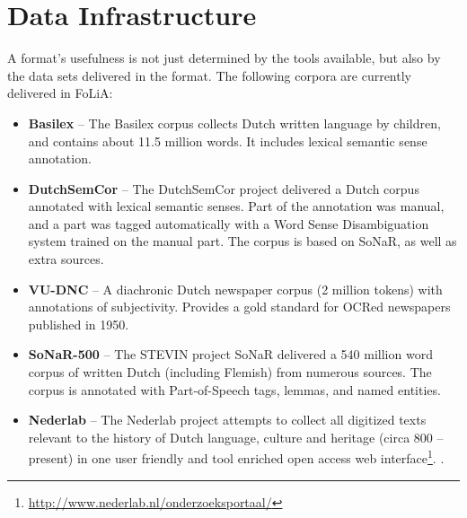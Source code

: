 \documentclass[a4paper,11pt]{article}
\begin{document}
{%

\section{Data Infrastructure}
\label{sec:datainfrastructure}

A format's usefulness is not just determined by the tools
available, but also by the data sets delivered in the format.
The following corpora are currently delivered in FoLiA:

\begin{itemize}
    \item \textbf{Basilex} -- The Basilex corpus collects Dutch written language by children,
        and contains about 11.5 million words. It includes lexical semantic sense
        annotation. \cite{BASILEX}
    \item \textbf{DutchSemCor} -- The DutchSemCor project delivered a Dutch corpus annotated
        with lexical semantic senses. Part of the annotation was manual, and a
        part was tagged automatically with a Word Sense Disambiguation system trained on
        the manual part. The corpus is based on SoNaR, as well as extra
        sources. \cite{DUTCHSEMCOR}
    \item \textbf{VU-DNC} -- A diachronic Dutch newspaper corpus (2 million tokens) with annotations of subjectivity. Provides a gold standard for OCRed newspapers published in 1950. \cite{VUDNC}
    \item \textbf{SoNaR-500} --  The STEVIN project SoNaR delivered a 540 million
        word corpus of written Dutch (including Flemish) from numerous sources.
        The corpus is annotated with Part-of-Speech tags, lemmas, and named
        entities. \cite{StevinSONAR2013}
    \item \textbf{Nederlab} -- The Nederlab project attempts to collect all digitized texts relevant to the history of Dutch language, culture and heritage (circa 800 -- present) in one user friendly and tool enriched open access web interface\footnote{\url{http://www.nederlab.nl/onderzoeksportaal/}}. \cite{Nederlab2016}. 
\end{itemize}

}
\end{document}

